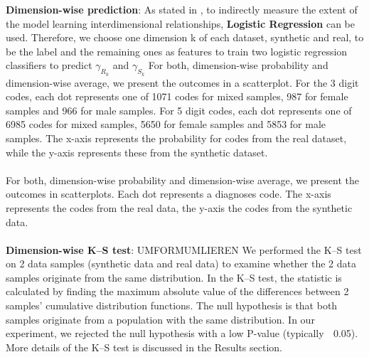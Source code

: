 \documentclass[11pt, a4paper]{book}
\begin{document}
\textbf{Dimension-wise prediction}: As stated in \cite{Choi2017}, to indirectly measure the extent of the model learning interdimensional relationships, \textbf{Logistic Regression} can be used. Therefore, we choose one dimension k of each dataset, synthetic and real, to be the label and the remaining  ones as features to train two logistic regression classifiers to predict $\gamma_R_k$ and $\gamma_S_k$
For both, dimension-wise probability and dimension-wise average, we present the outcomes in a scatterplot. For the 3 digit codes, each dot represents one of 1071 codes for mixed samples, 987 for female samples and 966 for male samples. For 5 digit codes, each dot represents one of 6985 codes for mixed samples, 5650 for female samples and 5853 for male samples. The x-axis represents the probability for codes from the real dataset, while the y-axis represents these from the synthetic dataset.
\\
\\
For both, dimension-wise probability and dimension-wise average, we present the outcomes in scatterplots. Each dot represents a diagnoses code. The x-axis represents the codes from the real data, the y-axis the codes from the synthetic data.
\\
\\
\textbf{Dimension-wise K–S test}: UMFORMUMLIEREN We performed the K–S test on 2 data samples (synthetic data and real data) to examine whether the 2 data samples originate from the same distribution. In the K–S test, the statistic is calculated by finding the maximum absolute value of the differences between 2 samples’ cumulative distribution functions. The null hypothesis is that both samples originate from a population with the same distribution. In our experiment, we rejected the null hypothesis with a low P-value (typically 􏰆 0.05). More details of the K–S test is discussed in the Results section. 
\end{document}
